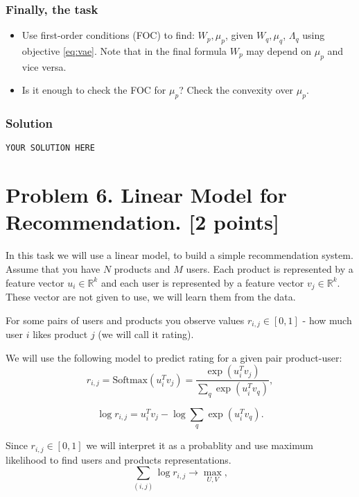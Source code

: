\documentclass{article}
\begin{document}
\subsubsection*{Finally, the task}
\begin{itemize}
    \item Use first-order conditions (FOC) to find: $W_p, \mu_p$, given $W_q, \mu_q$, $\Lambda_{q}$ using objective \eqref{eq:vae}. Note that in the final formula $W_p$ may depend on $\mu_p$ and vice versa.
    \item Is it  enough to check the FOC for $\mu_p$? Check the convexity over $\mu_p$.
\end{itemize}
\subsubsection*{Solution}
\texttt{YOUR SOLUTION HERE}

\newpage
\section*{Problem 6. Linear Model for Recommendation. [2 points]}

In this task we will use a linear model, to build a simple recommendation system. Assume that you have $N$ products and $M$ users. Each product is represented by a feature vector $u_{i} \in \mathbb{R}^k$ and each user is represented by a feature vector $v_{j} \in \mathbb{R}^k$. These vector are not given to use, we will learn them from the data.

For some pairs of users and products you observe values $r_{i,j} \in [0, 1]$ - how much user $i$ likes product $j$ (we will call it rating).

We will use the following model to predict rating for a given pair product-user:
\begin{equation}
    r_{i, j} = \text{Softmax}(u_i^T v_j) = \frac{\exp(u_i^T v_j)}{\sum_{q} \exp(u_i^T v_q)},
\end{equation}

\begin{equation}
 \log r_{i, j} = u_i^T v_j - \log \sum_{q} \exp(u_i^T v_q).
\end{equation}

Since $r_{i, j} \in [0, 1]$ we will interpret it as a probablity and use maximum likelihood to find users and products representations.
\begin{equation}\label{eq:objective}
 \sum_{(i, j)} \log r_{i, j} \rightarrow \max_{U, V} ,
\end{equation}
\end{document}
